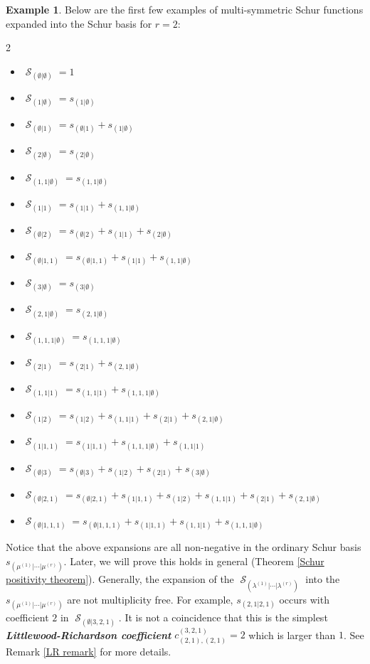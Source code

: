 \documentclass[12pt,reqno]{amsart}
\theoremstyle{definition}
\newtheorem{example}{Example}
\DeclareMathOperator{\cS}{\mathcal{S}}
\begin{document}
\begin{example}
Below are the first few examples of multi-symmetric Schur functions expanded into the Schur basis for $r = 2$:
    \begin{multicols}{2}
    \begin{itemize}
        \item $\cS_{(\emptyset|\emptyset)} = 1$
        \item $\cS_{(1|\emptyset)} = s_{(1|\emptyset)}$
        \item $\cS_{(\emptyset|1)} = s_{(\emptyset|1)} + s_{(1|\emptyset)} $
        \item $\cS_{(2|\emptyset)} = s_{(2|\emptyset)}$
        \item $\cS_{(1,1|\emptyset)} = s_{(1,1|\emptyset)}$
        \item $\cS_{(1|1)} = s_{(1|1)}+s_{(1,1|\emptyset)}$
        \item $\cS_{(\emptyset| 2)} = s_{(\emptyset|2)}+ s_{(1|1)} + s_{(2|\emptyset)}$
         \item $\cS_{(\emptyset|1,1)} = s_{(\emptyset|1,1)} + s_{(1|1)}+s_{(1,1|\emptyset)}$
        \item $\cS_{(3|\emptyset)} = s_{(3|\emptyset)}$
        \item $\cS_{(2,1|\emptyset)} = s_{(2,1|\emptyset)}$
        \item $\cS_{(1,1,1|\emptyset)} = s_{(1,1,1|\emptyset)}$
        \item $\cS_{(2|1)} = s_{(2|1)}+s_{(2,1|\emptyset)}$
        \item $\cS_{(1,1|1)} = s_{(1,1|1)}+s_{(1,1,1|\emptyset)}$
        \item $\cS_{(1|2)} = s_{(1|2)}+s_{(1,1|1)}+s_{(2|1)}+s_{(2,1|\emptyset)}$
        \item $\cS_{(1|1,1)} = s_{(1|1,1)}+s_{(1,1,1|\emptyset)} + s_{(1,1|1)}$
        \item $\cS_{(\emptyset|3)} = s_{(\emptyset|3)} + s_{(1|2)}+s_{(2|1)}+s_{(3|\emptyset)}$
        \item $\cS_{(\emptyset|2,1)}= s_{(\emptyset|2,1)}+s_{(1|1,1)} +s_{(1|2)}+s_{(1,1|1)}+s_{(2|1)}+s_{(2,1|\emptyset)}$
        \item $\cS_{(\emptyset|1,1,1)}= s_{(\emptyset|1,1,1)}+s_{(1|1,1)}+s_{(1,1|1)}+s_{(1,1,1|\emptyset)}$
        
    \end{itemize}
    \end{multicols}

Notice that the above expansions are all non-negative in the ordinary Schur basis $s_{(\mu^{(1)}|\cdots | \mu^{(r)})}$. Later, we will prove this holds in general (Theorem \ref{Schur positivity theorem}). Generally, the expansion of the $\cS_{(\lambda^{(1)}|\cdots | \lambda^{(r)})}$ into the $s_{(\mu^{(1)}|\cdots | \mu^{(r)})}$ are not multiplicity free. For example, $s_{(2,1|2,1)}$ occurs with coefficient $2$ in $\cS_{(\emptyset|3,2,1)}.$ It is not a coincidence that this is the simplest \textbf{\textit{Littlewood-Richardson coefficient}} $c_{(2,1),(2,1)}^{(3,2,1)} = 2$ which is larger than $1$. See Remark \ref{LR remark} for more details.
\end{example}
\end{document}
